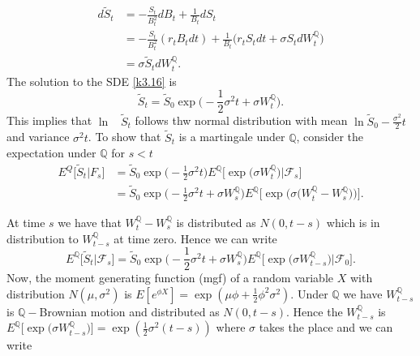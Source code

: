 \documentclass[a4 paper, 12pt]{report}
\theoremstyle{plain}
\begin{document}
\begin{equation}\label{k3.16}
\begin{split}
d\tilde{S}_t& = -\frac{S_t}{B_t^2}dB_t+\frac{1}{B_t}dS_t\\
& = -\frac{S_t}{B_t^2}(r_tB_tdt)+\frac{1}{B_t}\bigg(r_tS_tdt+\sigma S_tdW_t^\mathbb{Q}\bigg)\\
& = \sigma \tilde{S}_tdW_t^{\mathbb{Q}}.
\end{split}
\end{equation}
The solution to the SDE \eqref{k3.16} is
$$
\tilde{S}_t = \tilde{S}_0\exp\bigg(-\frac{1}{2}\sigma^2t+\sigma W_t^{\mathbb{Q}}\bigg).
$$
This implies that $\ln$ ~$\tilde{S}_t$ follows thw normal distribution with mean $\ln\tilde{S}_0 - \frac{\sigma^2}{2}t$ and variance $\sigma^2t$. To show that $\tilde{S}_t$ is a martingale under $\mathbb{Q}$, consider the expectation under $\mathbb{Q}$ for $s<t$
\begin{align*}
E^Q\bigg[\tilde{S}_t\bigg|F_s\bigg]& = \tilde{S}_0\exp\bigg(-\frac{1}{2}\sigma^2t\bigg)E^{\mathbb{Q}}\bigg[\exp\bigg(\sigma W_t^\mathbb{Q}\bigg)\bigg|\mathcal{F}_s\bigg]\\
& = \tilde{S}_0\exp\bigg(-\frac{1}{2}\sigma^2t+\sigma W_s^\mathbb{Q}\bigg)E^{\mathbb{Q}}\bigg[\exp\bigg(\sigma\bigg(W_t^\mathbb{Q} - W_s^\mathbb{Q}\bigg)\bigg)\bigg].
\end{align*} 

At time $s$ we have that $W_t^\mathbb{Q} - W_s^{\mathbb{Q}}$ is distributed as $N(0,t-s)$ which is in distribution to $W_{t-s}^\mathbb{Q}$ at time zero. Hence we can write
$$
E^{\mathbb{Q}}\bigg[\tilde{S}_t\bigg|\mathcal{F}_s\bigg] = \tilde{S}_0\exp\bigg(-\frac{1}{2}\sigma^2t+\sigma W_s^\mathbb{Q}\bigg)E^\mathbb{Q}\bigg[\exp\bigg(\sigma W^{\mathbb{Q}}_{t-s}\bigg)\bigg|\mathcal{F}_0\bigg].
$$ 
Now, the moment generating function (mgf) of a random variable $X$ with distribution $N(\mu,\sigma^2)$ is $E[e^{\phi X}] = \exp(\mu\phi+\frac{1}{2}\phi^2\sigma^2)$. Under $\mathbb{Q}$ we have $W_{t-s}^\mathbb{Q}$ is $\mathbb{Q}-$Brownian motion and distributed as $N(0,t-s)$. Hence the $W_{t-s}^\mathbb{Q}$ is $E^\mathbb{Q}\bigg[\exp\bigg(\sigma W^\mathbb{Q}_{t-s}\bigg)\bigg] = \exp(\frac{1}{2}\sigma^2(t-s))$ where $\sigma$ takes the place and we can write
\end{document}
